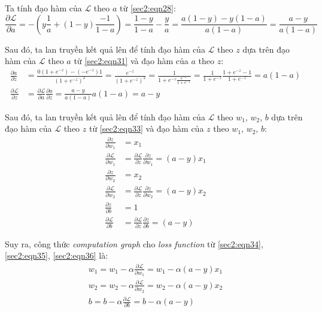Ta tính đạo hàm của $\mathcal{L}$ theo $a$ từ \ref{sec2:eqn28}:
\begin{equation}
\label{sec2:eqn31}
\frac{\partial \mathcal{L}}{\partial a} = -(y\frac{1}{a} + (1-y)\frac{-1}{1-a}) = \frac{1-y}{1-a} - \frac{y}{a} = \frac{a(1-y) - y(1-a)}{a(1-a)} = \frac{a-y}{a(1-a)}
\end{equation}

Sau đó, ta lan truyền kết quả lên để tính đạo hàm của $\mathcal{L}$ theo $z$ dựa trên đạo hàm của $\mathcal{L}$ theo $a$ từ \ref{sec2:eqn31} và đạo hàm của $a$ theo $z$:
\begin{align}
\frac{\partial a}{\partial z} &=  \frac{0(1 + e^{-z}) - (-e^{-z})1}{(1+e^{-z})^{2}} = \frac{e^{-z}}{(1+e^{-z})^{2}} = \frac{1}{1+e^{-z}\frac{e^{-z}}{1+e^{-z}}} = \frac{1}{1+e^{-z}}\frac{1+e^{-z}-1}{1+e^{-z}} = a(1-a)\\
\label{sec2:eqn33}
\frac{\partial \mathcal{L}}{\partial z} &= \frac{\partial \mathcal{L}}{\partial a}\frac{\partial a}{\partial z} = \frac{a-y}{a(1-a)}a(1-a) = a-y
\end{align}

Sau đó, ta lan truyền kết quả lên để tính đạo hàm của $\mathcal{L}$ theo $w_{1}$, $w_{2}$, $b$ dựa trên đạo hàm của $\mathcal{L}$ theo $z$ từ \ref{sec2:eqn33} và đạo hàm của $z$ theo $w_{1}$, $w_{2}$, $b$:
\begin{align}
\label{sec2:eqn34}
\frac{\partial z}{\partial w_{1}} &=  x_{1} \nonumber\\
\frac{\partial \mathcal{L}}{\partial w_{1}} &= \frac{\partial \mathcal{L}}{\partial z}\frac{\partial z}{\partial w_{1}} = (a-y)x_{1}\\
\label{sec2:eqn35}
\frac{\partial z}{\partial w_{2}} &=  x_{2} \nonumber\\
\frac{\partial \mathcal{L}}{\partial w_{2}} &= \frac{\partial \mathcal{L}}{\partial z}\frac{\partial z}{\partial w_{2}} = (a-y)x_{2}\\
\label{sec2:eqn36}
\frac{\partial z}{\partial b} &=  1 \nonumber\\
\frac{\partial \mathcal{L}}{\partial b} &= \frac{\partial \mathcal{L}}{\partial z}\frac{\partial z}{\partial b} = (a-y)
\end{align}

Suy ra, công thức \textit{computation graph} cho \textit{loss function} từ \ref{sec2:eqn34}, \ref{sec2:eqn35}, \ref{sec2:eqn36} là:
\begin{align}
\label{sec2:eqn37}
w_{1} = w_{1} - \alpha\frac{\partial \mathcal{L}}{\partial w_{1}} = w_{1} - \alpha(a-y)x_{1}\\
\label{sec2:eqn38}
w_{2} = w_{2} - \alpha\frac{\partial \mathcal{L}}{\partial w_{2}} = w_{2} - \alpha(a-y)x_{2}\\
\label{sec2:eqn39}
b = b - \alpha\frac{\partial \mathcal{L}}{\partial b} = b - \alpha(a-y)
\end{align}

